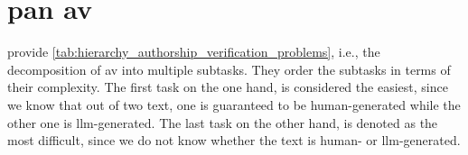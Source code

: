 \section{\acs{pan} \ac{av}}
\label{sec:pan_authorship_verification}

\citet{ayele_overview_2024} provide \autoref{tab:hierarchy_authorship_verification_problems}, i.e., 
the decomposition of \ac{av} into multiple subtasks. 
They order the subtasks in terms of their complexity.
The first task on the one hand, is considered the easiest, since we know that out of two text, one is guaranteed to be human-generated while the other one is \ac{llm}-generated.
The last task on the other hand, is denoted as the most difficult, since we do not know whether the text is human- or \ac{llm}-generated.


\begin{table}[tbp]
    \centering
    \caption{Hierarchy of \ac{av} problems from easiest (1) to most difficult (7), 
    where A, B corresponds to human-authored text and M denotes \ac{llm}-generated text.}
    \label{tab:hierarchy_authorship_verification_problems}
    \end{table}